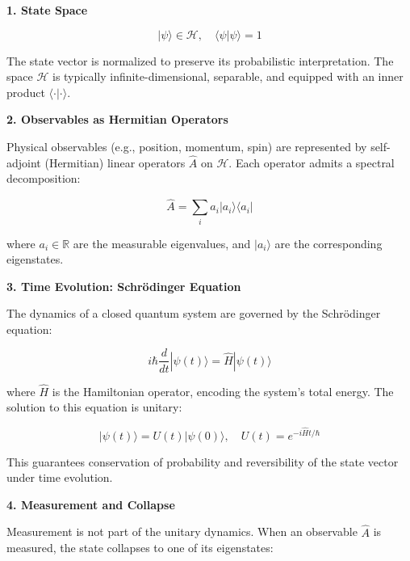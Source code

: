 \documentclass[11pt]{article}
\numberwithin{equation}{section} %
\begin{document}
\bigskip

\noindent\textbf{1. State Space}

\begin{equation}
|\psi\rangle \in \mathcal{H}, \quad \langle \psi | \psi \rangle = 1
\end{equation}

The state vector is normalized to preserve its probabilistic interpretation. The space \( \mathcal{H} \) is typically infinite-dimensional, separable, and equipped with an inner product \( \langle \cdot | \cdot \rangle \).

\bigskip

\noindent\textbf{2. Observables as Hermitian Operators}

Physical observables (e.g., position, momentum, spin) are represented by self-adjoint (Hermitian) linear operators \( \hat{A} \) on \( \mathcal{H} \). Each operator admits a spectral decomposition:

\begin{equation}
\hat{A} = \sum_i a_i |a_i\rangle \langle a_i|
\end{equation}

\noindent where \( a_i \in \mathbb{R} \) are the measurable eigenvalues, and \( |a_i\rangle \) are the corresponding eigenstates.

\bigskip

\noindent\textbf{3. Time Evolution: Schrödinger Equation}

The dynamics of a closed quantum system are governed by the Schrödinger equation:

\begin{equation}
i\hbar \frac{d}{dt} |\psi(t)\rangle = \hat{H} |\psi(t)\rangle
\end{equation}

\noindent where \( \hat{H} \) is the Hamiltonian operator, encoding the system’s total energy. The solution to this equation is unitary:

\begin{equation}
|\psi(t)\rangle = U(t) |\psi(0)\rangle, \quad U(t) = e^{-i\hat{H}t/\hbar}
\end{equation}

This guarantees conservation of probability and reversibility of the state vector under time evolution.

\bigskip

\noindent\textbf{4. Measurement and Collapse}

Measurement is not part of the unitary dynamics. When an observable \( \hat{A} \) is measured, the state collapses to one of its eigenstates:
\end{document}
